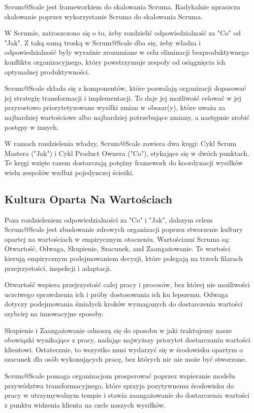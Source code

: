 \documentclass[12pt,a4paper,parskip=full]{scrartcl}
\begin{document}
Scrum@Scale jest frameworkiem do skalowania Scruma. Radykalnie upraszcza skalowanie poprzez wykorzystanie Scruma do skalowania Scruma.

W Scrumie, zatroszczono się o to, żeby rozdzielić odpowiedzialność za "Co" od "Jak". Z taką samą troską w Scrum@Scale dba się, żeby władza i odpowiedzialność były wyraźnie zrozumiane w celu eliminacji bezproduktywnego konfliktu organizacyjnego, który powstrzymuje zespoły od osiągnięcia ich optymalnej produktywności.

Scrum@Scale składa się z komponentów, które pozwalają organizacji dopasować jej strategię transformacji i implementacji. To daje jej możliwość celować w jej przyrostowo priorytetyzowane wysiłki zmian w obszar(y), które uważa za najbardziej wartościowe albo najbardziej potrzebujące zmiany, a następnie zrobić postępy w innych.

W ramach rozdzielenia władzy, Scrum@Scale zawiera dwa kręgi: Cykl Scrum Mastera ("Jak") i Cykl Product Ownera ("Co"), stykające się w dwóch punktach. Te kręgi wzięte razem dostarczają potężny framework do koordynacji wysiłków wielu zespołów wzdłuż pojedynczej ścieżki.

\subsection{Kultura Oparta Na Wartościach}

Poza rozdzieleniem odpowiedzialności za "Co" i "Jak", dalszym celem Scrum@Scale jest zbudowanie zdrowych organizacji poprzez stworzenie kultury opartej na wartościach w empirycznym otoczeniu. Wartościami Scruma są: Otwartość, Odwaga, Skupienie, Szacunek, and Zaangażowanie. Te wartości kierują empirycznym podejmowaniem decyzji, które polegają na trzech filarach przejrzystości, inspekcji i adaptacji.

Otwartość wspiera przejrzystość całej pracy i procesów, bez której nie możliwości uczciwego sprawdzenia ich i próby dostosowania ich ku lepszemu. Odwaga dotyczy podejmowania śmiałych kroków wymaganych do dostarczenia wartości szybciej na innowacyjne sposoby.

Skupienie i Zaangażowanie odnoszą się do sposobu w jaki traktujemy nasze obowiązki wynikające z pracy, nadając najwyższy priorytet dostarczaniu wartości klientowi. Ostatecznie, to wszystko musi wydarzyć się w środowisku opartym o szacunek dla osób wykonujących pracę, bez których nic nie może być stworzone.

Scrum@Scale pomaga organizacjom prosperować poprzez wspieranie modelu przywództwa transformacyjnego, które sprzyja pozytywnemu środowisku do pracy w utrzymywalnym tempie i stawia zaangażowanie do dostarczenia wartości z punktu widzenia klienta na czele naszych wysiłków.
\end{document}
